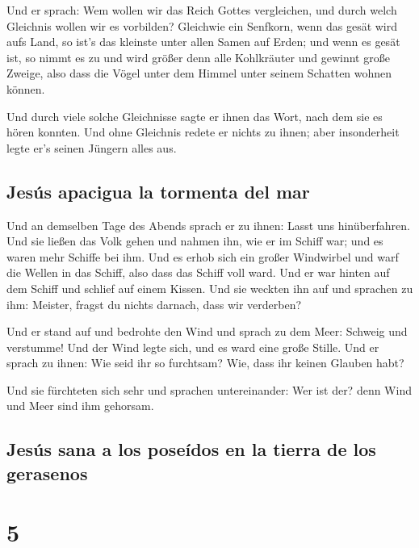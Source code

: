 Und er sprach: Wem wollen wir das Reich Gottes
vergleichen, und durch welch Gleichnis wollen wir es vorbilden?
 Gleichwie ein Senfkorn, wenn das gesät wird aufs Land,
so ist's das kleinste unter allen Samen auf Erden;  und
wenn es gesät ist, so nimmt es zu und wird größer denn alle Kohlkräuter
und gewinnt große Zweige, also dass die Vögel unter dem Himmel unter
seinem Schatten wohnen können.

 Und durch viele solche Gleichnisse sagte er ihnen das
Wort, nach dem sie es hören konnten.  Und ohne Gleichnis
redete er nichts zu ihnen; aber insonderheit legte er's seinen Jüngern
alles aus.

\hypertarget{jesuxfas-apacigua-la-tormenta-del-mar}{%
\subsection{Jesús apacigua la tormenta del
mar}\label{jesuxfas-apacigua-la-tormenta-del-mar}}

 Und an demselben Tage des Abends sprach er zu ihnen:
Lasst uns hinüberfahren.  Und sie ließen das Volk gehen
und nahmen ihn, wie er im Schiff war; und es waren mehr Schiffe bei ihm.
 Und es erhob sich ein großer Windwirbel und warf die
Wellen in das Schiff, also dass das Schiff voll ward. 
Und er war hinten auf dem Schiff und schlief auf einem Kissen. Und sie
weckten ihn auf und sprachen zu ihm: Meister, fragst du nichts darnach,
dass wir verderben?

 Und er stand auf und bedrohte den Wind und sprach zu dem
Meer: Schweig und verstumme! Und der Wind legte sich, und es ward eine
große Stille.  Und er sprach zu ihnen: Wie seid ihr so
furchtsam? Wie, dass ihr keinen Glauben habt?

 Und sie fürchteten sich sehr und sprachen untereinander:
Wer ist der? denn Wind und Meer sind ihm gehorsam.

\hypertarget{jesuxfas-sana-a-los-poseuxeddos-en-la-tierra-de-los-gerasenos}{%
\subsection{Jesús sana a los poseídos en la tierra de los
gerasenos}\label{jesuxfas-sana-a-los-poseuxeddos-en-la-tierra-de-los-gerasenos}}

\hypertarget{section-4}{%
\section{5}\label{section-4}}

